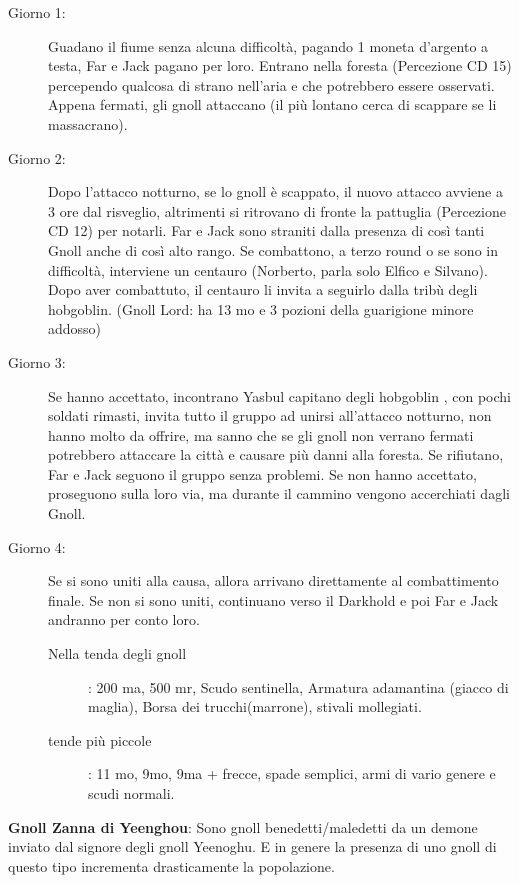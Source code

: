\documentclass{article}
\begin{document}
\begin{description}
    \item[Giorno 1:] Guadano il fiume senza alcuna difficoltà, pagando 1 moneta d'argento a testa, Far e Jack pagano per loro. Entrano nella foresta (Percezione CD 15) percependo qualcosa di strano nell'aria e che potrebbero essere osservati. Appena fermati, gli gnoll attaccano (il più lontano cerca di scappare se li massacrano).
    
    \item[Giorno 2:] Dopo l'attacco notturno, se lo gnoll è scappato, il nuovo attacco avviene a 3 ore dal risveglio, altrimenti si ritrovano di fronte la pattuglia (Percezione CD 12) per notarli. Far e Jack sono straniti dalla presenza di così tanti Gnoll anche di così alto rango. Se combattono, a terzo round o se sono in difficoltà, interviene un centauro (Norberto, parla solo Elfico e Silvano). Dopo aver combattuto, il centauro li invita a seguirlo dalla tribù degli hobgoblin. (Gnoll Lord: ha 13 mo e 3 pozioni della guarigione minore addosso)
    
    \item[Giorno 3:] Se hanno accettato, incontrano Yasbul capitano degli hobgoblin , con pochi soldati rimasti, invita tutto il gruppo ad unirsi all'attacco notturno, non hanno molto da offrire, ma sanno che se gli gnoll non verrano fermati potrebbero attaccare la città e causare più danni alla foresta. Se rifiutano, Far e Jack seguono il gruppo senza problemi. Se non hanno accettato, proseguono sulla loro via, ma durante il cammino vengono accerchiati dagli Gnoll. 
    
    \item[Giorno 4:] Se si sono uniti alla causa, allora arrivano direttamente al combattimento finale. Se non si sono uniti, continuano verso il Darkhold e poi Far e Jack andranno per conto loro.
        \begin{description}
            \item[Nella tenda degli gnoll] : 200 ma, 500 mr, Scudo sentinella, Armatura adamantina (giacco di maglia), Borsa dei trucchi(marrone), stivali mollegiati. 
            \item[tende più piccole]: 11 mo, 9mo, 9ma + frecce, spade semplici, armi di vario genere e scudi normali. 
        \end{description}
\end{description}

\textbf{Gnoll Zanna di Yeenghou}: Sono gnoll benedetti/maledetti da un demone inviato dal signore degli gnoll Yeenoghu. E in genere la presenza di uno gnoll di questo tipo incrementa drasticamente la popolazione. 
\end{document}
